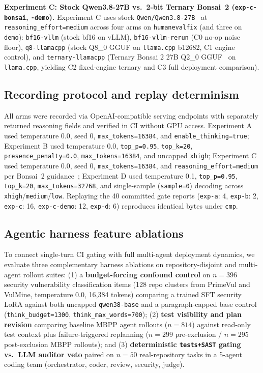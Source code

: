 \documentclass[conference]{IEEEtran}
\begin{document}
\textbf{Experiment C: Stock Qwen3.8-27B vs.\ 2-bit Ternary Bonsai~2 (\texttt{exp-{}c-{}bonsai}, \texttt{-{}demo}).} Experiment C uses stock \texttt{Qwen/\allowbreak{}Qwen3.8-{}27B}~\cite{qwen38card} at \texttt{reasoning\_\allowbreak{}effort=medium} across four arms on \texttt{humanevalfix} (and three on \texttt{demo}): \texttt{bf16-{}vllm} (stock bf16 on vLLM), \texttt{bf16-{}vllm-{}rerun} (C0 no-op noise floor), \texttt{q8-{}llamacpp} (stock Q8\_0 GGUF on \texttt{llama.\allowbreak{}cpp} b12682, C1 engine control), and \texttt{ternary-{}llamacpp} (Ternary Bonsai 2 27B Q2\_0 GGUF~\cite{bonsai2} on \texttt{llama.\allowbreak{}cpp}, yielding C2 fixed-engine ternary and C3 full deployment comparison).

\subsection{Recording protocol and replay determinism}
\label{sec:method-recording}

All arms were recorded via OpenAI-compatible serving endpoints with separately returned reasoning fields and verified in CI without GPU access. Experiment A used temperature 0.0, seed 0, \texttt{max\_\allowbreak{}tokens=16384}, and \texttt{enable\_\allowbreak{}thinking=true}; Experiment B used temperature 0.0, \texttt{top\_p=0.95}, \texttt{top\_k=20}, \texttt{presence\_\allowbreak{}penalty=0.0}, \texttt{max\_\allowbreak{}tokens=16384}, and uncapped \texttt{xhigh}; Experiment C used temperature 0.0, seed 0, \texttt{max\_\allowbreak{}tokens=16384}, and \texttt{reasoning\_\allowbreak{}effort=medium} per Bonsai~2 guidance~\cite{bonsai2}; Experiment D used temperature 0.1, \texttt{top\_p=0.95}, \texttt{top\_k=20}, \texttt{max\_\allowbreak{}tokens=32768}, and single-sample (\texttt{sample=0}) decoding across \texttt{xhigh}/\texttt{medium}/\texttt{low}. Replaying the 40 committed gate reports (\texttt{exp-a}: 4, \texttt{exp-b}: 2, \texttt{exp-c}: 16, \texttt{exp-c-demo}: 12, \texttt{exp-d}: 6) reproduces identical bytes under \texttt{cmp}.

\subsection{Agentic harness feature ablations}
\label{sec:method-ablations}

To connect single-turn CI gating with full multi-agent deployment dynamics, we evaluate three complementary harness ablations on repository-disjoint and multi-agent rollout suites: (1) a \textbf{budget-forcing confound control} on $n=396$ security vulnerability classification items (128 repo clusters from PrimeVul and VulMine, temperature 0.0, 16,384 tokens) comparing a trained SFT security LoRA against both uncapped \texttt{qwen38-base} and a paragraph-capped base control (\texttt{think\_budget=1300}, \texttt{think\_max\_words=700}); (2) \textbf{test visibility and plan revision} comparing baseline MBPP agent rollouts ($n=814$) against read-only test context plus failure-triggered replanning ($n=299$ pre-exclusion / $n=295$ post-exclusion MBPP rollouts); and (3) \textbf{deterministic \texttt{tests+SAST} gating vs.\ LLM auditor veto} paired on $n=50$ real-repository tasks in a 5-agent coding team (orchestrator, coder, review, security, judge).
\end{document}
